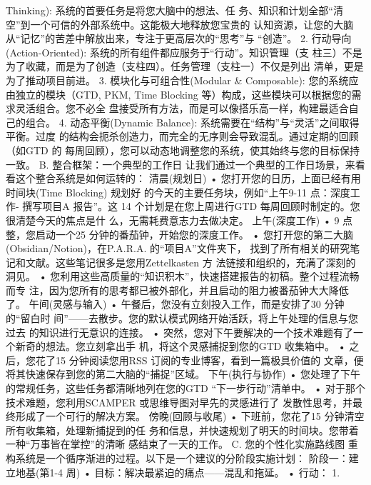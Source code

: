 \documentclass[a4paper,12pt]{article}
\begin{document}
\begin{multicols}{2}
    Thinking): 系统的首要任务是将您大脑中的想法、任
    务、知识和计划全部``清空''到一个可信的外部系统中。这能极大地释放您宝贵的
    认知资源，让您的大脑从``记忆''的苦差中解放出来，专注于更高层次的``思考''与
    ``创造''。 2. 行动导向(Action-Oriented):
    系统的所有组件都应服务于``行动''。知识管理（支
    柱三）不是为了收藏，而是为了创造（支柱四）。任务管理（支柱一）不仅是列出
    清单，更是为了推动项目前进。 3. 模块化与可组合性(Modular \&
    Composable): 您的系统应由独立的模块（GTD, PKM, Time Blocking
    等）构成，这些模块可以根据您的需求灵活组合。您不必全
    盘接受所有方法，而是可以像搭乐高一样，构建最适合自己的组合。 4.
    动态平衡(Dynamic Balance):
    系统需要在``结构''与``灵活''之间取得平衡。过度
    的结构会扼杀创造力，而完全的无序则会导致混乱。通过定期的回顾（如GTD
    的
    每周回顾），您可以动态地调整您的系统，使其始终与您的目标保持一致。
    B. 整合框架：一个典型的工作日
    让我们通过一个典型的工作日场景，来看看这个整合系统是如何运转的：
    清晨(规划日) • 您打开您的日历，上面已经有用时间块(Time Blocking)
    规划好 的今天的主要任务块，例如``上午9-11 点：深度工作- 撰写项目A
    报告''。这 14 个计划是在您上周进行GTD
    每周回顾时制定的。您很清楚今天的焦点是什
    么，无需耗费意志力去做决定。 上午(深度工作) • 9 点整，您启动一个25
    分钟的番茄钟，开始您的深度工作。 •
    您打开您的第二大脑(Obsidian/Notion)，在P.A.R.A.
    的``项目A''文件夹下，
    找到了所有相关的研究笔记和文献。这些笔记很多是您用Zettelkasten 方
    法链接和组织的，充满了深刻的洞见。 •
    您利用这些高质量的``知识积木''，快速搭建报告的初稿。整个过程流畅而专
    注，因为您所有的思考都已被外部化，并且启动的阻力被番茄钟大大降低了。
    午间(灵感与输入) • 午餐后，您没有立刻投入工作，而是安排了30
    分钟的``留白时
    间''------去散步。您的默认模式网络开始活跃，将上午处理的信息与您过去
    的知识进行无意识的连接。 •
    突然，您对下午要解决的一个技术难题有了一个新奇的想法。您立刻拿出手
    机，将这个灵感捕捉到您的GTD 收集箱中。 • 之后，您花了15
    分钟阅读您用RSS 订阅的专业博客，看到一篇极具价值的
    文章，便将其快速保存到您的第二大脑的``捕捉''区域。 下午(执行与协作)
    • 您处理了下午的常规任务，这些任务都清晰地列在您的GTD
    ``下一步行动''清单中。 • 对于那个技术难题，您利用SCAMPER
    或思维导图对早先的灵感进行了
    发散性思考，并最终形成了一个可行的解决方案。 傍晚(回顾与收尾) •
    下班前，您花了15 分钟清空所有收集箱，处理新捕捉到的任
    务和信息，并快速规划了明天的时间块。您带着一种``万事皆在掌控''的清晰
    感结束了一天的工作。 C. 您的个性化实施路线图
    重构系统是一个循序渐进的过程。以下是一个建议的分阶段实施计划：
    阶段一：建立地基(第1-4 周) •
    目标：解决最紧迫的痛点------混乱和拖延。 • 行动： 1.

\end{multicols}
\end{document}
